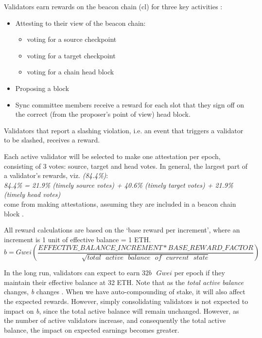 \documentclass[UTF8]{article}
\begin{document}
Validators earn rewards on the beacon chain (\gls{cl}) for three key activities \cite{Edgington2023}:
\begin{itemize}
\item Attesting to their view of the beacon chain:
	\begin{itemize}
	\item voting for a source checkpoint
	\item voting for a target checkpoint
	\item voting for a chain head block
	\end{itemize}
\item Proposing a block	
\item Sync committee members receive a reward for each slot that they sign off on the correct (from the proposer's point of view) head block.
\end{itemize}

Validators that report a slashing violation, i.e. an event that triggers a validator to be slashed, receives a reward. 

Each active validator will be selected to make one attestation per epoch, consisting of 3 votes: source, target and head votes. 
In general, the largest part of a validator's rewards, viz. \textit{(84.4\%)}: \\
\textit{84.4\% = 21.9\% (timely source votes) + 40.6\% (timely target votes) +  21.9\% (timely head votes)}\\
come from making attestations, assuming they are included in a beacon chain block \cite{Edgington2023}. 

All reward calculations are based on the `base reward per increment', where an increment is 1 unit of effective balance = 1 ETH.
\begin{equation*}
 b = Gwei \left( \frac{EFFECTIVE\_BALANCE\_INCREMENT * BASE\_REWARD\_FACTOR}{\sqrt {total \texttt{ } active \texttt{ } balance  \texttt{ } of  \texttt{ } current  \texttt{ } state}} \right)
\end{equation*}

In the long run, validators can expect to earn $32b \texttt{ } Gwei$ per epoch if they maintain their effective balance at 32 ETH. Note that as the \textit{total active balance} changes, \textit{b} changes  \cite{Edgington2023}. When we have auto-compounding of stake, it will also affect the expected rewards. However, simply consolidating validators is not expected to impact on \textit{b}, since the total active balance will remain unchanged. However, as the number of active validators increase, and consequently the total active balance, the impact on expected earnings becomes greater.
\end{document}
